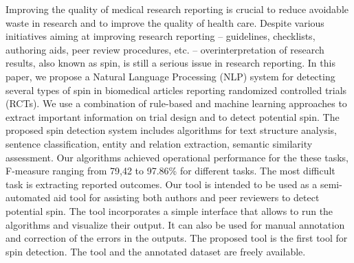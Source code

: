 Improving the quality of medical research reporting is crucial to reduce avoidable waste in research and to improve the quality of health care. Despite various initiatives aiming at improving research reporting -- guidelines, checklists, authoring aids, peer review procedures, etc. -- overinterpretation of research results, also known as spin, is still a serious issue in research reporting. In this paper, we propose a Natural Language Processing (NLP) system for detecting several types of spin in biomedical articles reporting randomized controlled trials (RCTs). We use a combination of rule-based and machine learning approaches to extract important information on trial design and to detect potential spin. The proposed spin detection system includes algorithms for text structure analysis, sentence classification, entity and relation extraction, semantic similarity assessment. Our algorithms achieved operational performance for the these tasks, F-measure ranging from 79,42 to 97.86\% for different tasks. The most difficult task is extracting reported outcomes. Our tool is intended to be used as a semi-automated aid tool for assisting both authors and peer reviewers to detect potential spin. The tool incorporates a simple interface that allows to run the algorithms and visualize their output. It can also be used for manual annotation and correction of the errors in the outputs. The proposed tool is the first tool for spin detection.  The tool and the annotated dataset are freely available.
